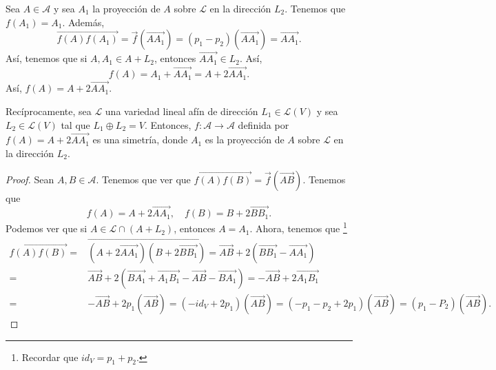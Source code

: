 Sea $\displaystyle A \in \mathcal{A} $ y sea $\displaystyle A_{1} $ la proyección de $\displaystyle A $ sobre $\displaystyle \mathcal{L} $ en la dirección $\displaystyle L_{2}$. Tenemos que $\displaystyle f\left(A_{1}\right) = A_{1} $. Además, 
\[\overrightarrow{f\left(A\right)f\left(A_{1}\right)} = \vec{f}\left(\overrightarrow{AA_{1}} \right) = \left(p_{1}-p_{2}\right)\left(\overrightarrow{AA_{1}}\right) = \overrightarrow{AA_{1}}  .\]
Así, tenemos que si $\displaystyle A, A_{1} \in A+L_{2} $, entonces $\displaystyle \overrightarrow{AA_{1}} \in L_{2} $. Así,
\[f\left(A\right) = A_{1} + \overrightarrow{AA_{1}} = A + 2\overrightarrow{AA_{1}}  .\]
Así, $\displaystyle f\left(A\right) = A + 2\overrightarrow{AA_{1}}  $. 
\begin{fprop}[]
\normalfont Recíprocamente, sea $\displaystyle \mathcal{L} $ una variedad lineal afín de dirección $\displaystyle L_{1} \in \mathcal{L}\left(V\right)$ y sea $\displaystyle L_{2} \in \mathcal{L}\left(V\right) $ tal que $\displaystyle L_{1} \oplus L_{2} = V $. Entonces, $\displaystyle f : \mathcal{A} \to \mathcal{A} $ definida por $\displaystyle f\left(A\right) = A + 2\overrightarrow{AA_{1}}  $ es una simetría, donde $\displaystyle A_{1} $ es la proyección de $\displaystyle A $ sobre $\displaystyle \mathcal{L} $ en la dirección $\displaystyle L_{2} $.
\end{fprop}
\begin{proof}
Sean $\displaystyle A,B \in \mathcal{A} $. Tenemos que ver que $\displaystyle \overrightarrow{f\left(A\right)f\left(B\right)} = \vec{f}\left(\overrightarrow{AB} \right) $. Tenemos que 
\[f\left(A\right) = A + 2\overrightarrow{AA_{1}}, \quad f\left(B\right) = B + 2\overrightarrow{BB_{1}}  .\]
Podemos ver que si $\displaystyle A \in \mathcal{L} \cap \left(A + L_{2}\right) $, entonces $\displaystyle A = A_{1} $. Ahora, tenemos que \footnote{Recordar que $\displaystyle id _{V} = p_{1} + p_{2} $.} 
\[
\begin{split}
	\overrightarrow{f\left(A\right)f\left(B\right)} = & \overrightarrow{\left(A + 2\overrightarrow{AA_{1}} \right)\left(B + 2\overrightarrow{BB_{1}} \right)} =\overrightarrow{AB} +2\left(\overrightarrow{BB_{1}} -\overrightarrow{AA_{1}} \right) \\
	= &  \overrightarrow{AB} +2\left(\overrightarrow{BA_{1}} +\overrightarrow{A_{1}B_{1}} -\overrightarrow{AB} -\overrightarrow{BA_{1}} \right) 
	= -\overrightarrow{AB} +2\overrightarrow{A_{1}B_{1}} \\
	= &  -\overrightarrow{AB} +2p_{1}\left(\overrightarrow{AB} \right) = \left(-id _{V} + 2 p_{1}\right)\left(\overrightarrow{AB} \right) =\left(-p_{1}-p_{2}  + 2p_{1}\right)\left(\overrightarrow{AB} \right) = \left(p_{1}-P_{2}\right)\left(\overrightarrow{AB} \right) .
\end{split}
\]
\end{proof}
